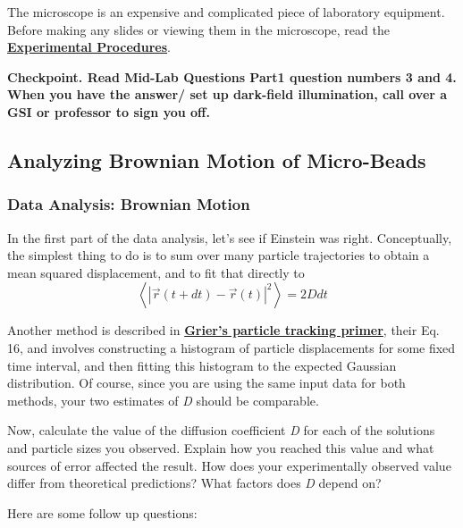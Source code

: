\documentclass{../lab}
\begin{document}
The microscope is an expensive and complicated piece of laboratory equipment. Before making any slides or viewing them in the microscope, read the \href{http://experimentationlab.berkeley.edu/node/84}{\textbf{Experimental Procedures}}.

\textbf{Checkpoint. Read Mid-Lab Questions Part1 question numbers 3 and 4. When you have the answer/ set up dark-field illumination, call over a GSI or professor to sign you off.}

\subsection{Analyzing Brownian Motion of Micro-Beads}

\subsubsection{Data Analysis: Brownian Motion}

In the first part of the data analysis, let's see if Einstein was right. Conceptually, the simplest thing to do is to sum over many particle trajectories to obtain a mean squared displacement, and to fit that directly to
\[
\left\langle {\left| \vec r(t+dt)-\vec r(t) \right|}^2 \right\rangle = 2 D dt
\]

Another method is described in \href{http://www.physics.nyu.edu/grierlab/methods/node11.html#eqes}{\textbf{Grier's particle tracking primer}}, their Eq. 16, and involves constructing a histogram of particle displacements for some fixed time interval, and then fitting this histogram to the expected Gaussian distribution. Of course, since you are using the same input data for both methods, your two estimates of \emph{D} should be comparable.

Now, calculate the value of the diffusion coefficient \emph{D} for each of the solutions and particle sizes you observed. Explain how you reached this value and what sources of error affected the result. How does your experimentally observed value differ from theoretical predictions? What factors does \emph{D} depend on?

Here are some follow up questions:
\end{document}
